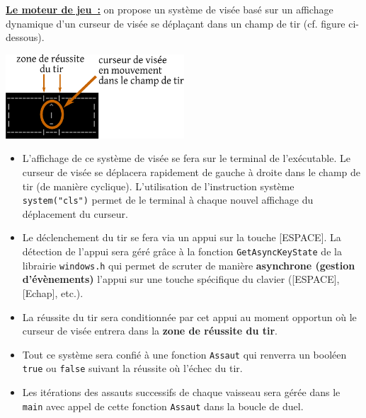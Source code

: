 \documentclass[10pt, fleqn, a4paper]{article}
\newcommand{\bfcolor}[2]{\textcolor{#1}{\textbf{#2}}}
\newcommand\myframecolor{}
\newcommand\mybgcolor{}
\newenvironment{mycolorbox}[2]
{
\def\myframecolor{#1}
\def\mybgcolor{#2}
\begingroup
\begin{lrbox}{\mytextbox}
\begin{minipage}[t]{\textwidth}
}
{
\end{minipage}\end{lrbox}
\fcolorbox{\myframecolor}{\mybgcolor}{\usebox{\mytextbox}}
\endgroup
}
\begin{document}
\begin{mycolorbox}{black}{yellow}
\bfcolor{redCM}{\underline{Le \og{}moteur de jeu\fg{}~:}} on propose un système de visée basé sur un affichage dynamique d'un curseur de visée se déplaçant dans un champ de tir (cf. figure ci-dessous).

\begin{center}
\includegraphics[width=0.5\textwidth]{moteur_visee}
\end{center}

\begin{itemize}
\item[\ding{223}] L'affichage de ce système de visée se fera sur le terminal de l'exécutable. Le curseur de visée se déplacera rapidement de gauche à droite dans le champ de tir (de manière cyclique). L'utilisation de l'instruction système \texttt{system("cls")} permet de \og{} le terminal à chaque nouvel affichage du déplacement du curseur.
\item[\ding{223}] Le déclenchement du tir se fera via un appui sur la touche [ESPACE]. La détection de l'appui sera géré grâce à la fonction  \texttt{GetAsyncKeyState} de la librairie \texttt{windows.h} qui permet de \og{}scruter\fg{} de manière \textbf{asynchrone (gestion d'évènements)} l'appui sur une touche spécifique du clavier ([ESPACE], [Echap], etc.).
\item[\ding{223}] La réussite du tir sera conditionnée par cet appui au moment opportun où le curseur de visée entrera dans la \textbf{zone de réussite du tir}.
\item[\ding{223}] Tout ce système sera confié à une fonction \texttt{Assaut} qui renverra un booléen \texttt{true} ou \texttt{false} suivant la réussite où l'échec du tir.
\item[\ding{223}] Les itérations des assauts successifs de chaque vaisseau sera gérée dans le \texttt{main} avec appel de cette fonction \texttt{Assaut} dans la boucle de duel.
\end{itemize}


\end{mycolorbox}
\end{document}
